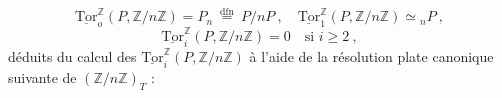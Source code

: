 \begin{equation*}
\underline{\mathrm{Tor}}^{\mathbb{Z}}_o(P,\mathbb{Z}/n\mathbb{Z}) = P_n \ \overset{\mathrm{dfn}}{=} \ P/nP \ , \quad \underline{\mathrm{Tor}}^{\mathbb{Z}}_1(P,\mathbb{Z}/n\mathbb{Z}) \simeq {}_nP \ ,
\end{equation*}
\begin{equation*}
\underline{\mathrm{Tor}}^{\mathbb{Z}}_i(P,\mathbb{Z}/n\mathbb{Z}) = 0 \quad \text{si } i \geq 2 \ ,
\end{equation*}
déduits du calcul des $\underline{\mathrm{Tor}}^{\mathbb{Z}}_i(P,\mathbb{Z}/n\mathbb{Z})$ à l'aide de la résolution plate canonique suivante de $(\mathbb{Z}/n\mathbb{Z})_T$ :

\begin{center}
\end{center}


